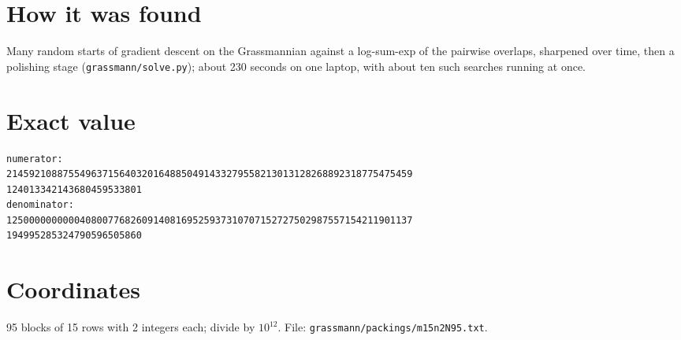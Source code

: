 \documentclass[11pt,a4paper]{article}
\begin{document}
\section{How it was found}
Many random starts of gradient descent on the Grassmannian against a log-sum-exp of the pairwise overlaps, sharpened over time, then a polishing stage (\texttt{grassmann/solve.py}); about 230 seconds on one laptop, with about ten such searches running at once.


\appendix
\section{Exact value}
{\small
\begin{verbatim}
numerator:
214592108875549637156403201648850491433279558213013128268892318775475459
124013342143680459533801
denominator:
125000000000040800776826091408169525937310707152727502987557154211901137
194995285324790596505860
\end{verbatim}}

\section{Coordinates}
95 blocks of 15 rows with 2 integers each; divide by $10^{12}$. File: \texttt{grassmann/packings/m15n2N95.txt}.
{\tiny
\begin{multicols}{4}
\end{multicols}}
\end{document}

